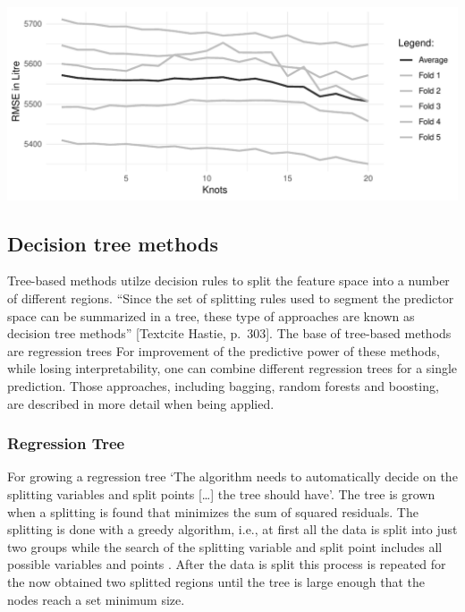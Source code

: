 \documentclass[11pt,]{article}
\begin{document}
\includegraphics{../00_data/output_paper/08_splines.pdf}

\hypertarget{decision-tree-methods}{%
\subsection{Decision tree methods}\label{decision-tree-methods}}

Tree-based methods utilze decision rules to split the feature space into
a number of different regions. ``Since the set of splitting rules used
to segment the predictor space can be summarized in a tree, these type
of approaches are known as decision tree methods'' {[}Textcite Hastie,
p.~303{]}. The base of tree-based methods are regression trees For
improvement of the predictive power of these methods, while losing
interpretability, one can combine different regression trees for a
single prediction. Those approaches, including bagging, random forests
and boosting, are described in more detail when being applied.

\hypertarget{regression-tree}{%
\subsubsection{Regression Tree}\label{regression-tree}}

For growing a regression tree `The algorithm needs to automatically
decide on the splitting variables and split points {[}\ldots{]} the tree
should have'\autocite[p.349]{Hastie2013}. The tree is grown when a
splitting is found that minimizes the sum of squared residuals. The
splitting is done with a greedy algorithm, i.e., at first all the data
is split into just two groups while the search of the splitting variable
and split point includes all possible variables and points
\autocite[cf.~][p.349]{Hastie2013}. After the data is split this process
is repeated for the now obtained two splitted regions until the tree is
large enough that the nodes reach a set minimum size.
\end{document}
